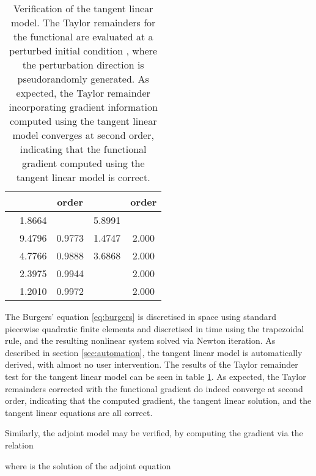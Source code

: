 \documentclass{siamltex}
\begin{document}
\begin{table}
\centering
\begin{tabular}{ccccc}
\toprule
 & \small{} & order & \small{} & order \\
\midrule
 & 1.8664  &    & 5.8991  & \\
 & 9.4796   & 0.9773 & 1.4747  & 2.000 \\
 & 4.7766  & 0.9888 &  3.6868  & 2.000 \\
 & 2.3975  & 0.9944 &  & 2.000 \\
 & 1.2010  & 0.9972 &   & 2.000 \\
\bottomrule
\end{tabular}
\caption{Verification of the tangent linear model. The Taylor remainders for the functional
   are evaluated at a perturbed initial condition
  , where the perturbation
  direction  is pseudorandomly generated. As expected, the
  Taylor remainder incorporating gradient information computed using
  the tangent linear model converges at second order, indicating that
  the functional gradient computed using the tangent linear model is
  correct.}
\label{tab:burgers_tlm}
\end{table}
The Burgers' equation \eqref{eq:burgers} is discretised in space using standard piecewise quadratic finite elements and discretised in time
using the trapezoidal rule, and the resulting nonlinear system solved via Newton iteration. As described in section \ref{sec:automation}, the tangent linear model
is automatically derived, with almost no user intervention. The results of the Taylor remainder test for the
tangent linear model can be seen in table \ref{tab:burgers_tlm}. As expected, the Taylor remainders corrected with
the functional gradient do indeed converge at second order, indicating that the computed gradient, the tangent linear
solution, and the tangent linear equations are all correct.

Similarly, the adjoint model may be verified, by computing the gradient  via
the relation

where  is the solution of the adjoint equation
\end{document}
